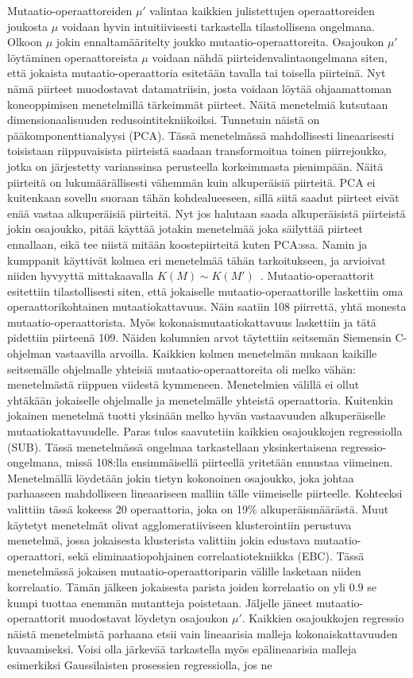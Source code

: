 \documentclass{tktltiki}
\begin{document}
Mutaatio-operaattoreiden $\mu'$ valintaa kaikkien julistettujen operaattoreiden joukosta $\mu$ voidaan hyvin intuitiivisesti tarkastella tilastollisena ongelmana. Olkoon $\mu$ jokin ennaltamääritelty joukko mutaatio-operaattoreita. Osajoukon $\mu'$ löytäminen operaattoreista $\mu$ voidaan nähdä piirteidenvalintaongelmana siten, että jokaista mutaatio-operaattoria esitetään tavalla tai toisella piirteinä. Nyt nämä piirteet muodostavat datamatriisin, josta voidaan löytää ohjaamattoman koneoppimisen menetelmillä tärkeimmät piirteet. Näitä menetelmiä kutsutaan dimensionaalisuuden redusointitekniikoiksi. Tunnetuin näistä on pääkomponenttianalyysi (PCA). Tässä menetelmässä mahdollisesti lineaarisesti toisistaan riippuvaisista piirteistä saadaan transformoitua toinen piirrejoukko, jotka on järjestetty varianssinsa perusteella korkeimmasta pienimpään. Näitä piirteitä on lukumäärällisesti vähemmän kuin alkuperäisiä piirteitä. PCA ei kuitenkaan sovellu suoraan tähän kohdealueeseen, sillä siitä saadut piirteet eivät enää vastaa alkuperäisiä piirteitä. Nyt jos halutaan saada alkuperäisistä piirteistä jokin osajoukko, pitää käyttää jotakin menetelmää joka säilyttää piirteet ennallaan, eikä tee niistä mitään koostepiirteitä kuten PCA:ssa. Namin ja kumppanit käyttivät kolmea eri menetelmää tähän tarkoitukseen, ja arvioivat niiden hyvyyttä mittakaavalla $K(M) \sim K(M')$~\cite{NaminA06}. Mutaatio-operaattorit esitettiin tilastollisesti siten, että jokaiselle mutaatio-operaattorille laskettiin oma operaattorikohtainen mutaatiokattavuus. Näin saatiin 108 piirrettä, yhtä monesta mutaatio-operaattorista. Myös kokonaismutaatiokattavuus laskettiin ja tätä pidettiin piirteenä 109. Näiden kolumnien arvot täytettiin seitsemän Siemensin C-ohjelman vastaavilla arvoilla. Kaikkien kolmen menetelmän mukaan kaikille seitsemälle ohjelmalle yhteisiä mutaatio-operaattoreita oli melko vähän: menetelmästä riippuen viidestä kymmeneen. Menetelmien välillä ei ollut yhtäkään jokaiselle ohjelmalle ja menetelmälle yhteistä operaattoria. Kuitenkin jokainen menetelmä tuotti yksinään melko hyvän vastaavuuden alkuperäiselle mutaatiokattavuudelle. Paras tulos saavutetiin kaikkien osajoukkojen regressiolla (SUB). Tässä menetelmässä ongelmaa tarkastellaan yksinkertaisena regressio-ongelmana, missä 108:lla ensimmäisellä piirteellä yritetään ennustaa viimeinen. Menetelmällä löydetään jokin tietyn kokonoinen osajoukko, joka johtaa parhaaseen mahdolliseen lineaariseen malliin tälle viimeiselle piirteelle. Kohteeksi valittiin tässä kokeess 20 operaattoria, joka on 19\% alkuperäismäärästä. Muut käytetyt menetelmät olivat agglomeratiiviseen klusterointiin perustuva menetelmä, jossa jokaisesta klusterista valittiin jokin edustava mutaatio-operaattori, sekä eliminaatiopohjainen correlaatiotekniikka (EBC). Tässä menetelmässä jokaisen mutaatio-operaattoriparin välille lasketaan niiden korrelaatio. Tämän jälkeen jokaisesta parista joiden korrelaatio on yli $0.9$ se kumpi tuottaa enemmän mutantteja poistetaan. Jäljelle jäneet mutaatio-operaattorit muodostavat löydetyn osajoukon $\mu'$. Kaikkien osajoukkojen regressio näistä menetelmistä parhaana etsii vain lineaarisia malleja kokonaiskattavuuden kuvaamiseksi. Voisi olla järkevää tarkastella myös epälineaarisia malleja esimerkiksi Gaussilaisten prosessien regressiolla, jos ne 
\end{document}
